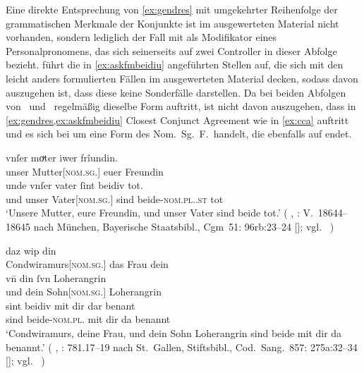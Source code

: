 Eine direkte Entsprechung von \cref{ex:gendres} mit umgekehrter Reihenfolge der
grammatischen Merkmale der Konjunkte ist im ausgewerteten Material nicht
vorhanden, sondern lediglich der Fall mit  als Modifikator
eines Personalpronomens, das sich seinerseits auf zwei Controller in dieser
Abfolge bezieht. \citet[96, 145]{askedal1973} führt die in
\cref{ex:askfmbeidiu} angeführten Stellen auf, die sich mit den leicht anders
formulierten Fällen im ausgewerteten Material decken, sodass davon auszugehen
ist, dass diese keine Sonderfälle darstellen. Da bei beiden Abfolgen von
\MascM\ und \FemF\ regelmäßig dieselbe Form  auftritt, ist nicht
davon auszugehen, dass in \cref{ex:gendres,ex:askfmbeidiu} Closest Conjunct
Agreement wie in \cref{ex:cca} auftritt und es sich bei  um eine
Form des Nom.~Sg.~F.\ handelt, die ebenfalls auf  endet.

\begin{exe}
	\ex \label{ex:askfmbeidiu}
		\begin{xlist}
		\ex \gll vnſer moͮter iwer frîundin. \\
				unser Mutter[\textsc{nom.sg.\FemF}] euer Freundin \\
		\sn \gll unde vnſer vater ſint beidiv tot. \\
				und unser Vater[\textsc{nom.sg.\MascM}] sind beide-\textsc{nom.pl.\NeutMF.st} 
					tot \\
			\trans `Unsere Mutter, eure Freundin, und unser Vater sind beide
				tot.'
				(%
					, : V.~18644--18645
					nach München, Bayerische Staatsbibl., Cgm~51: 96rb:23--24
					[\cite[1286]{hsc}];
					vgl.~\cite[259]{maroldschroeder1969}%
				)
			\label{ex:askfmbeidiu_1}
	
		\ex {} daz wip din \\
				Condwiramurs[\textsc{nom.sg.\FemF}] das Frau dein \\
		\sn \gll vn̄ din ſvn Loherangrin \\
				und dein Sohn[\textsc{nom.sg.\MascM}] Loherangrin \\
		\sn \gll sint beidiv mit dir dar benant \\
				sind beide-\textsc{nom.pl.\NeutMF} mit dir da benannt \\
		\trans `Condwiramurs, deine Frau, und dein Sohn Loherangrin
			sind beide mit dir da benannt.'
			(%
				, : 781.17--19
				nach St.~Gallen, Stiftsbibl., Cod.~Sang.~857: 275a:32--34
				[\cite[1211]{hsc}];
				vgl.~\cite[785]{knechtschirok2003}%
			)
			\label{ex:askfmbeidiu_2}
	\end{xlist}
\end{exe}


